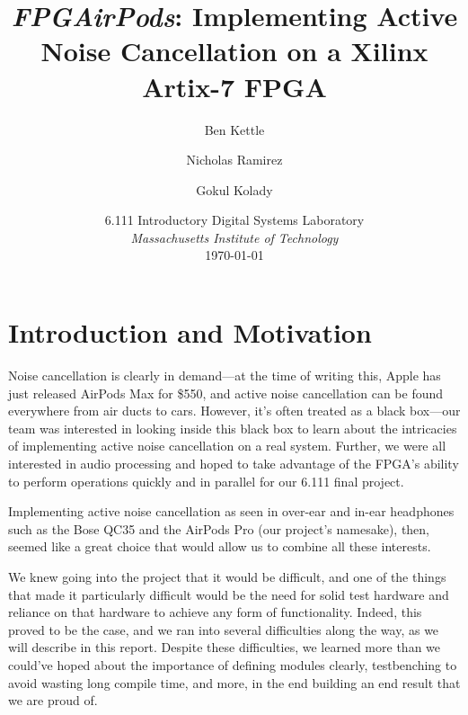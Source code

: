 \documentclass{fpgairpods}
\begin{document}
\title{\textit{FPGAirPods}: Implementing Active Noise Cancellation on a Xilinx Artix-7 FPGA}
\date{6.111 Introductory Digital Systems Laboratory \\ \textit{Massachusetts Institute of Technology} \\ \today}
\author{Ben Kettle \\  
\and Nicholas Ramirez \\  \and Gokul Kolady \\ }

\maketitle
\tableofcontents
\listoffigures

\newpage
\section{Introduction and Motivation}

Noise cancellation is clearly in demand---at the time of writing this, Apple has just released AirPods Max for \$550, and active noise cancellation can be found everywhere from air ducts to cars. However, it's often treated as a black box---our team was interested in looking inside this black box to learn about the intricacies of implementing active noise cancellation on a real system. Further, we were all interested in audio processing and hoped to take advantage of the FPGA's ability to perform operations quickly and in parallel for our 6.111 final project.

Implementing active noise cancellation as seen in over-ear and in-ear headphones such as the Bose QC35 and the AirPods Pro (our project's namesake), then, seemed like a great choice that would allow us to combine all these interests.

We knew going into the project that it would be difficult, and one of the things that made it particularly difficult would be the need for solid test hardware and reliance on that hardware to achieve any form of functionality. Indeed, this proved to be the case, and we ran into several difficulties along the way, as we will describe in this report. Despite these difficulties, we learned more than we could've hoped about the importance of defining modules clearly, testbenching to avoid wasting long compile time, and more, in the end building an end result that we are proud of.
\end{document}
